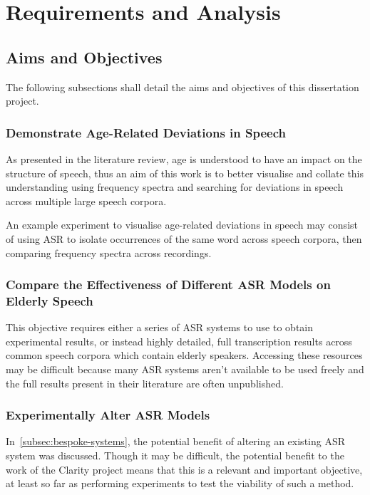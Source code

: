 \chapter{Requirements and Analysis}\label{ch:requirements-and-analysis}

\section{Aims and Objectives}\label{sec:aims-and-objectives2}

The following subsections shall detail the aims and objectives of this dissertation project.

\subsection{Demonstrate Age-Related Deviations in Speech}\label{subsec:aim1}

As presented in the literature review, age is understood to have an impact on the structure of
speech, thus an aim of this work is to better visualise and collate this understanding using
frequency spectra and searching for deviations in speech across multiple large speech corpora.

An example experiment to visualise age-related deviations in speech may consist of using ASR to
isolate occurrences of the same word across speech corpora, then comparing frequency spectra
across recordings.

\subsection{Compare the Effectiveness of Different ASR Models on Elderly Speech}\label{subsec:aim2}

This objective requires either a series of ASR systems to use to obtain experimental results, or
instead highly detailed, full transcription results across common speech corpora which contain
elderly speakers.
Accessing these resources may be difficult because many ASR systems aren't available to be used
freely and the full results present in their literature are often unpublished.

\subsection{Experimentally Alter ASR Models}\label{subsec:aim3}

In~\ref{subsec:bespoke-systems}, the potential benefit of altering an existing ASR system was
discussed.
Though it may be difficult, the potential benefit to the work of the Clarity project means that
this is a relevant and important objective, at least so far as performing experiments to test the
viability of such a method.

